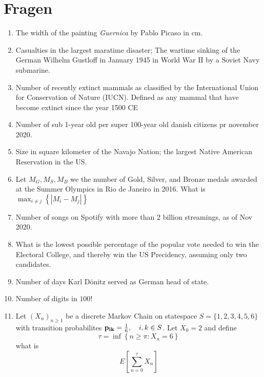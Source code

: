 \documentclass[12pt,a4paper]{article}
\begin{document}
\section*{Fragen}
\begin{enumerate}

  \item The width of the painting \textit{Guernica} by Pablo Picaso in cm.

  \item Casualties in the largest maratime disaster; The wartime sinking of the German Wilhelm Gustloff in January 1945 in World War II by a Soviet Navy submarine.

  \item Number of recently extinct mammals as classified by the International Union for Conservation of Nature (IUCN). Defined as any mammal that have become extinct since the year 1500 CE

  \item Number of sub 1-year old per super 100-year old danish citizens pr november 2020.
  
  \item Size in square kilometer of the Navajo Nation; the largest Native American Reservation in the US.
  
  \item Let $M_G, M_S, M_B$ we the number of Gold, Silver, and Bronze medals awarded at the Summer Olympics in Rio de Janeiro in 2016. What is $\max_{i \neq j} \left\{ |M_i - M_j| \right\}$
  
  \item Number of songs on Spotify with more than 2 billion streamings, as of Nov 2020.
  
  \item What is the lowest possible percentage of the popular vote needed to win the Electoral College, and thereby win the US Precidency, assuming only two candidates.
  
  \item Number of days Karl Dönitz served as German head of state.
  
  \item Number of digits in $100!$
  
  \item Let $(X_n)_{n \geq 1}$ be a discrete Markov Chain on statespace $S = \{1,2,3,4,5,6\}$ 
  with transition probabilites $\bold{p_{ik}} = \frac{1}{6}, \quad i,k \in S$.
  Let $X_0 = 2$ and define 
  $$\tau = \inf\left\{ n \geq \pi : X_n = 6 \right\}$$
  what is 
  $$ E \left[ \sum_{n = 0}^{\tau}X_n \right] $$
  
  
  
 

\end{enumerate}
\end{document}
